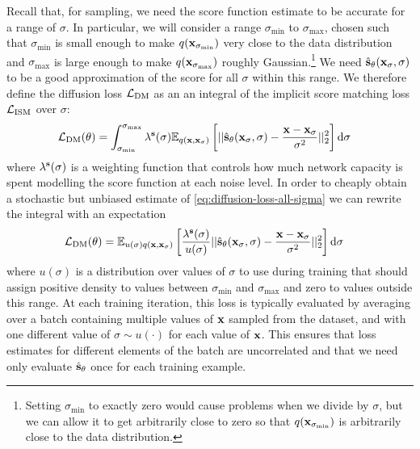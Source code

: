 Recall that, for sampling, we need the score function estimate to be accurate for a range of $\sigma$. In particular, we will consider a range $\sigma_\text{min}$ to $\sigma_\text{max}$, chosen such that $\sigma_\text{min}$ is small enough to make $q({\mathbf{x}}_{\sigma_\text{min}})$ very close to the data distribution and $\sigma_\text{max}$ is large enough to make $q({\mathbf{x}}_{\sigma_\text{max}})$ roughly Gaussian.\footnote{Setting $\sigma_\text{min}$ to exactly zero would cause problems when we divide by $\sigma$, but we can allow it to get arbitrarily close to zero so that $q({\mathbf{x}}_{\sigma_\text{min}})$ is arbitrarily close to the data distribution.} We need $\hat{{\mathbf{s}}}_\theta({\mathbf{x}}_\sigma, \sigma)$ to be a good approximation of the score for all $\sigma$ within this range. We therefore define the diffusion loss ${\mathcal{L}}_\text{DM}$ as an an integral of the implicit score matching loss ${\mathcal{L}}_\text{ISM}$ over $\sigma$:
\begin{align} \label{eq:diffusion-loss-all-sigma}
    \mathcal{L}_\text{DM}(\theta) &= \int_{\sigma_\text{min}}^{\sigma_\text{max}} \lambda^{\mathbf{s}}(\sigma) \mathbb{E}_{q({\mathbf{x}}, {\mathbf{x}}_\sigma)} \left[ 
    || \hat{{\mathbf{s}}}_\theta({\mathbf{x}}_\sigma, \sigma) - \frac{{\mathbf{x}}-{\mathbf{x}}_\sigma}{\sigma^2} ||_2^2 \right] \mathrm{d}\sigma
\end{align}
where $\lambda^{\mathbf{s}}(\sigma)$ is a weighting function that controls how much network capacity is spent modelling the score function at each noise level. In order to cheaply obtain a stochastic but unbiased estimate of \cref{eq:diffusion-loss-all-sigma} we can rewrite the integral with an expectation
\begin{align} \label{eq:exp-diffusion-loss-all-sigma}
    \mathcal{L}_\text{DM}(\theta) &= \mathbb{E}_{u(\sigma)q({\mathbf{x}}, {\mathbf{x}}_\sigma)} \left[ \frac{\lambda^{\mathbf{s}}(\sigma)}{u(\sigma)} 
    || \hat{{\mathbf{s}}}_\theta({\mathbf{x}}_\sigma, \sigma) - \frac{{\mathbf{x}}-{\mathbf{x}}_\sigma}{\sigma^2} ||_2^2 \right] \mathrm{d}\sigma
\end{align}
where $u(\sigma)$ is a distribution over values of $\sigma$ to use during training that should assign positive density to values between $\sigma_\text{min}$ and $\sigma_\text{max}$ and zero to values outside this range. At each training iteration, this loss is typically evaluated by averaging over a batch containing multiple values of ${\mathbf{x}}$ sampled from the dataset, and with one different value of $\sigma \sim u(\cdot)$ for each value of ${\mathbf{x}}$. This ensures that loss estimates for different elements of the batch are uncorrelated and that we need only evaluate $\hat{{\mathbf{s}}}_\theta$ once for each training example.



